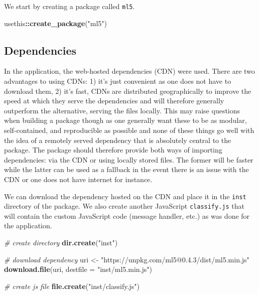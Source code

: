 \documentclass[10pt,]{krantz}
\makeatletter
\newenvironment{Shaded}{\begin{snugshade}}{\end{snugshade}}
\newcommand{\CommentTok}[1]{\textcolor[rgb]{0.37,0.37,0.37}{\textit{#1}}}
\newcommand{\DataTypeTok}[1]{\textcolor[rgb]{0.27,0.27,0.27}{#1}}
\newcommand{\KeywordTok}[1]{\textcolor[rgb]{0.27,0.27,0.27}{\textbf{#1}}}
\newcommand{\NormalTok}[1]{#1}
\newcommand{\OperatorTok}[1]{\textcolor[rgb]{0.43,0.43,0.43}{\textbf{#1}}}
\newcommand{\StringTok}[1]{\textcolor[rgb]{0.5,0.5,0.5}{#1}}
\newenvironment{kframe}{%
\medskip{}
\setlength{\fboxsep}{.8em}
 \def\at@end@of@kframe{}%
 \ifinner\ifhmode%
  \def\at@end@of@kframe{\end{minipage}}%
  \begin{minipage}{\columnwidth}%
 \fi\fi%
 \def\FrameCommand##1{\hskip\@totalleftmargin \hskip-\fboxsep
 \colorbox{shadecolor}{##1}\hskip-\fboxsep
     \hskip-\linewidth \hskip-\@totalleftmargin \hskip\columnwidth}%
 \MakeFramed {\advance\hsize-\width
   \@totalleftmargin\z@ \linewidth\hsize
   \@setminipage}}%
 {\par\unskip\endMakeFramed%
 \at@end@of@kframe}
\renewenvironment{Shaded}{\begin{kframe}}{\end{kframe}}
\makeatother
\begin{document}
We start by creating a package called \texttt{ml5}.

\begin{Shaded}
\begin{Highlighting}[]
\NormalTok{usethis}\OperatorTok{::}\KeywordTok{create_package}\NormalTok{(}\StringTok{"ml5"}\NormalTok{)}
\end{Highlighting}
\end{Shaded}

\hypertarget{shiny-complete-pkg-deps}{%
\subsection{Dependencies}\label{shiny-complete-pkg-deps}}

In the application, the web-hosted dependencies (CDN) were used. There are two advantages to using CDNs: 1) it's just convenient as one does not have to download them, 2) it's fast, CDNs are distributed geographically to improve the speed at which they serve the dependencies and will therefore generally outperform the alternative, serving the files locally. This may raise questions when building a package though as one generally want these to be as modular, self-contained, and reproducible as possible and none of these things go well with the idea of a remotely served dependency that is absolutely central to the package. The package should therefore provide both ways of importing dependencies: via the CDN or using locally stored files. The former will be faster while the latter can be used as a fallback in the event there is an issue with the CDN or one does not have internet for instance.

We can download the dependency hosted on the CDN and place it in the \texttt{inst} directory of the package. We also create another JavaScript \texttt{classify.js} that will contain the custom JavaScript code (message handler, etc.) as was done for the application.

\begin{Shaded}
\begin{Highlighting}[]
\CommentTok{# create directory}
\KeywordTok{dir.create}\NormalTok{(}\StringTok{"inst"}\NormalTok{)}

\CommentTok{# download dependency}
\NormalTok{uri <-}\StringTok{ "https://unpkg.com/ml5@0.4.3/dist/ml5.min.js"}
\KeywordTok{download.file}\NormalTok{(uri, }\DataTypeTok{destfile =} \StringTok{"inst/ml5.min.js"}\NormalTok{)}

\CommentTok{# create js file }
\KeywordTok{file.create}\NormalTok{(}\StringTok{"inst/classify.js"}\NormalTok{)}
\end{Highlighting}
\end{Shaded}
\end{document}
